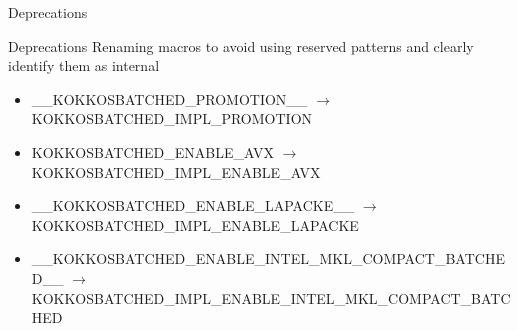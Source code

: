 \begin{frame}[fragile]

  {\Huge Deprecations}

  \vspace{10pt}

\end{frame}

\begin{frame}[fragile]{Deprecations}
  Renaming macros to avoid using reserved patterns and clearly identify them as internal
  \begin{itemize}
    \item {\ttfamily \_\_KOKKOSBATCHED\_PROMOTION\_\_} $\rightarrow$ {\ttfamily KOKKOSBATCHED\_IMPL\_PROMOTION}
    \item {\ttfamily KOKKOSBATCHED\_ENABLE\_AVX} $\rightarrow$ {\ttfamily KOKKOSBATCHED\_IMPL\_ENABLE\_AVX}
    \item {\ttfamily \_\_KOKKOSBATCHED\_ENABLE\_LAPACKE\_\_} $\rightarrow$ {\ttfamily KOKKOSBATCHED\_IMPL\_ENABLE\_LAPACKE}
    \item {\ttfamily \_\_KOKKOSBATCHED\_ENABLE\_INTEL\_MKL\_COMPACT\_BATCHED\_\_} $\rightarrow$ {\ttfamily KOKKOSBATCHED\_IMPL\_ENABLE\_INTEL\_MKL\_COMPACT\_BATCHED}
  \end{itemize}
\end{frame}
